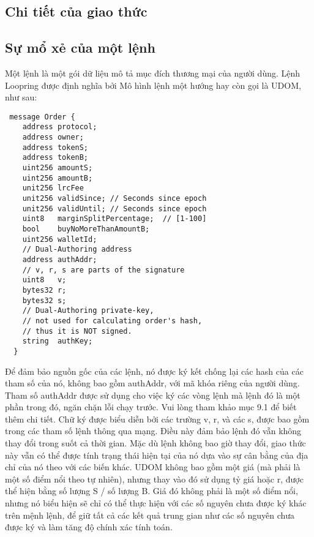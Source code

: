\documentclass[12pt,a4paper]{article}
\begin{document}
\begin{multicols}{2}
\section{Chi tiết của giao thức\label{sec:protocol}}
\subsection{Sự mổ xẻ của một lệnh\label{anatomy}}
Một lệnh là một gói dữ liệu mô tả mục đích thương mại của người dùng. Lệnh Loopring được định nghĩa bởi Mô hình lệnh một hướng hay còn gọi là UDOM, như sau:
\begin{small}
\begin{verbatim}
 message Order {
    address protocol;
    address owner;
    address tokenS;
    address tokenB;
    uint256 amountS;
    uint256 amountB;
    unit256 lrcFee
    unit256 validSince; // Seconds since epoch
    unit256 validUntil; // Seconds since epoch
    uint8   marginSplitPercentage;  // [1-100]
    bool    buyNoMoreThanAmountB;
    uint256 walletId;
    // Dual-Authoring address
    address authAddr;
    // v, r, s are parts of the signature
    uint8   v;
    bytes32 r;
    bytes32 s;
    // Dual-Authoring private-key,
    // not used for calculating order's hash,
    // thus it is NOT signed.
    string  authKey;
  }
\end{verbatim}
\end{small}
Để đảm bảo nguồn gốc của các lệnh, nó được ký kết chống lại các hash của các tham số của nó, không bao gồm authAddr, với mã khóa riêng của người dùng. Tham số authAddr được sử dụng cho việc ký các vòng lệnh mà lệnh đó là một phần trong đó, ngăn chặn lỗi chạy trước. Vui lòng tham khảo mục 9.1 để biết thêm chi tiết. Chữ ký được biểu diễn bởi các trường v, r, và các s, được bao gồm trong các tham số lệnh thông qua mạng. Điều này đảm bảo lệnh đó vẫn không thay đổi trong suốt cả thời gian. Mặc dù lệnh không bao giờ thay đổi, giao thức này vẫn có thể được tính trạng thái hiện tại của nó dựa vào sự cân bằng của địa chỉ của nó theo với các biến khác.
UDOM không bao gồm một giá (mà phải là một số điểm nổi theo tự nhiên), nhưng thay vào đó sử dụng tỷ giá hoặc r, được thể hiện bằng số lượng S / số lượng B. Giá đó không phải là một số điểm nổi, nhưng nó biểu hiện sẽ chỉ có thể thực hiện với các số nguyên chưa được ký khác trên mệnh lệnh, để giữ tất cả các kết quả trung gian như các số nguyên chưa được ký và làm tăng độ chính xác tính toán.


\end{multicols}
\end{document}
